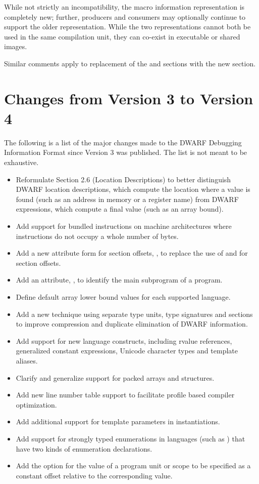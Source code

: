 While not strictly an incompatibility, the macro information 
representation is completely new; further, producers 
and consumers may optionally continue to support the older 
representation. While the two representations cannot both be 
used in the same compilation unit, they can co-exist in 
executable or shared images.

Similar comments apply to replacement of the \dotdebugpubnames{} 
and \dotdebugpubtypes{} sections with the new \dotdebugnames{} 
section.
\bbeb

\section{Changes from Version 3 to Version 4}
The following is a list of the major changes made to the 
DWARF Debugging Information Format since Version 3 was 
published. The list is not meant to be exhaustive.
\begin{itemize}
\item Reformulate 
Section 2.6 (Location Descriptions) 
to better distinguish DWARF location descriptions, which
compute the location where a value is found (such as an 
address in memory or a register name) from DWARF expressions, 
which compute a final value (such as an array bound).
\item Add support for bundled instructions on machine architectures 
where instructions do not occupy a whole number of bytes.
\item Add a new attribute form for section offsets, 
\DWFORMsecoffsetNAME,
to replace the use of 
\DWFORMdatafourNAME{} and \DWFORMdataeightNAME{} for section offsets.
\item Add an attribute, \DWATmainsubprogramNAME, to identify the main subprogram of a
program.
\item Define default array lower bound values for each supported language.
\item Add a new technique using separate type units, type signatures and \COMDAT{} sections to
improve compression and duplicate elimination of DWARF information.
\item Add support for new  language constructs, including rvalue references, generalized
constant expressions, Unicode character types and template aliases.
\item Clarify and generalize support for packed arrays and structures.
\item Add new line number table support to facilitate profile based compiler optimization.
\item Add additional support for template parameters in instantiations.
\item Add support for strongly typed enumerations in languages (such as ) that have two
kinds of enumeration declarations.
\item 
\bb
Add the option for the \DWAThighpc{} value of a program unit or scope to be 
specified as a constant offset relative to the corresponding \DWATlowpc{} value.
\eb
\end{itemize}
